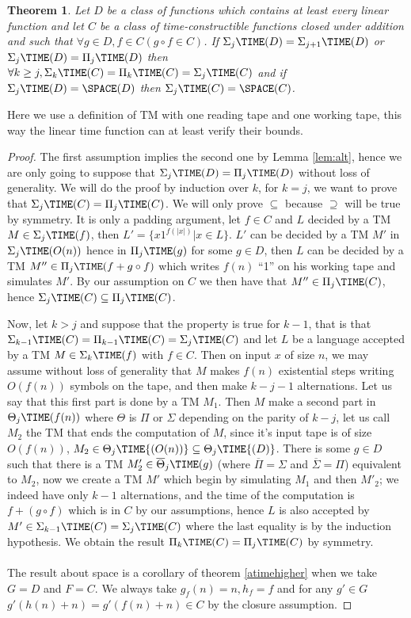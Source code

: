 \documentclass[a4paper,12pt]{article}
\newtheorem{theorem}{Theorem}[section]
\theoremstyle{definition}
\newcommand{\ATIME}[2]{\ensuremath{\Sigma_{#2}\TIME(#1)}}
\newcommand{\coATIME}[2]{\ensuremath{\Pi_{#2}\TIME(#1)}}
\newcommand{\ol}{\overline}
\begin{document}
\begin{theorem}\label{little_collapse}
  Let $D$ be a class of functions which contains at least every linear
  function and let $C$ be a class of time-constructible functions
  closed under addition and such that $\forall g\in D,f\in C(g\circ
  f\in C)$. If $\ATIME{D}{j}=\ATIME{D}{j+1}$ or
  $\ATIME{D}{j}=\coATIME{D}{j}$ then $\forall k\ge
  j,\ATIME{C}{k}=\coATIME{C}{k}=\ATIME{C}{j}$ and if
  $\ATIME{D}{j}=\SPACE(D)$ then $\ATIME{C}{j}=\SPACE(C)$.
\end{theorem}
Here we use a definition of TM with one reading tape and one working
tape, this way the linear time function can at least verify their
bounds.
\begin{proof}
  The first assumption implies the second one by Lemma \ref{lem:alt},
  hence we are only going to suppose that
  $\ATIME{D}{j}=\coATIME{D}{j}$ without loss of generality. We will do
  the proof by induction over $k$, for $k=j$, we want to prove that
  $\ATIME{C}{j}=\coATIME{C}{j}$.  We will only prove $\subseteq$
  because $\supseteq$ will be true by symmetry. It is only a padding
  argument, let $f\in C$ and $L$ decided by a TM $M\in\ATIME{f}{j}$,
  then $L'=\{x1^{f(|x|)}|x\in L\}$. $L'$ can be decided by a TM $M'$
  in $\ATIME{O(n)}{j}$ hence in $\coATIME{g}{j}$ for some $g\in D$,
  then $L$ can be decided by a TM $M''\in\coATIME{f+g\circ f}{j}$
  which writes $f(n)$ ``1'' on his working tape and simulates $M'$. By
  our assumption on $C$ we then have that $M''\in\coATIME{C}{j}$,
  hence $\ATIME{C}{j}\subseteq\coATIME{C}{j}$.

  Now, let $k>j$ and suppose that the property is true for $k-1$, that
  is that $\ATIME{C}{k-1}=\coATIME{C}{k-1}=\ATIME{C}{j}$ and let $L$
  be a language accepted by a TM $M\in \ATIME{f}{k}$ with $f\in
  C$. Then on input $x$ of size $n$, we may assume without loss of
  generality that $M$ makes $f(n)$ existential steps writing $O(f(n))$
  symbols on the tape, and then make $k-j-1$ alternations. Let us say
  that this first part is done by a TM $M_{1}$. Then $M$ make a second
  part in $\Theta_{j}\TIME(f(n))$ where $\Theta$ is $\Pi$ or $\Sigma$
  depending on the parity of $k-j$, let us call $M_{2}$ the TM that
  ends the computation of $M$, since it's input tape is of size
  $O(f(n))$, $M_{2}\in \Theta_{j}\TIME{(O(n))}\subseteq
  \Theta_{j}\TIME{(D)}$. There is some $g\in D$ such that there is a
  TM $M'_{2}\in\ol \Theta_{j}\TIME(g)$ (where $\ol \Pi =\Sigma$ and
  $\ol\Sigma=\Pi$) equivalent to $M_{2}$, now we create a TM $M'$
  which begin by simulating $M_{1}$ and then $M'_{2}$; we indeed have
  only $k-1$ alternations, and the time of the computation is
  $f+(g\circ f)$ which is in $C$ by our assumptions, hence $L$ is also
  accepted by $M'\in\ATIME{C}{k-1}=\ATIME{C}{j}$ where the last
  equality is by the induction hypothesis. We obtain the result
  $\coATIME{C}{k}=\coATIME{C}{j}$ by symmetry.
\paragraph{}
The result about space is a corollary of theorem \ref{atimehigher}
when we take $G=D$ and $F=C$. We always take $g_{f}(n)=n,h_{f}=f$ and
for any $g'\in G$ $g'(h(n)+n)=g'(f(n)+n)\in C$ by the closure
assumption.
\end{proof}
\end{document}
